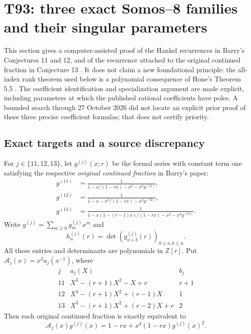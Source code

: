 \documentclass[11pt,a4paper]{article}
\theoremstyle{definition}
\theoremstyle{remark}
\begin{document}
\section{T93: three exact Somos--8 families and their singular parameters}
\label{retry93:sec}

This section gives a computer-assisted proof of the Hankel recurrences in
Barry's Conjectures 11 and 12, and of the recurrence attached to the original
continued fraction in Conjecture 13 \cite{retry93:barry}. It does not claim a
new foundational principle: the all-index rank theorem used below is a
polynomial consequence of Hone's Theorem 5.5 \cite{retry93:hone}. The
coefficient identification and specialization argument are made explicit,
including parameters at which the published rational coefficients have
poles. A bounded search through 27 October 2026 did not locate an explicit
prior proof of these three precise coefficient formulas; that does not
certify priority.

\subsection{Exact targets and a source discrepancy}
For $j\in\{11,12,13\}$, let $g^{(j)}(x;r)$ be the formal series with
constant term one satisfying the respective \emph{original continued
fraction} in Barry's paper:
\begin{align*}
 g^{(11)}&=\frac{1}{1-x/(1-rx)-x^2-x^3g^{(11)}},\\
 g^{(12)}&=\frac{1}{1-x-x^2/(1-rx)-x^3g^{(12)}},\\
 g^{(13)}&=\frac{1}{1-x(1-(r-1)x)/(1-rx)-x^2-x^3g^{(13)}}.
\end{align*}
Write $g^{(j)}=\sum_{m\ge0}g_m^{(j)}x^m$ and
\[
 h_n^{(j)}(r)=\det(g_{a+b}^{(j)}(r))_{0\le a,b\le n}.
\]
All these entries and determinants are polynomials in $\mathbb Z[r]$.
Put $\mathcal A_j(x)=x^3a_j(x^{-1})$, where
\[
\begin{array}{c|l|l}
j&a_j(X)&b_j\\ \hline
11&X^3-(r+1)X^2-X+r&r+1\\
12&X^3-(r+1)X^2+(r-1)X&1\\
13&X^3-(r+1)X^2+(r-2)X+r&2
\end{array}
\]
Then each original continued fraction is exactly equivalent to
\begin{equation}\label{retry93:quadratic}
 \mathcal A_j(x)g^{(j)}(x)=1-rx+x^3(1-rx)g^{(j)}(x)^2.
\end{equation}
\end{document}
